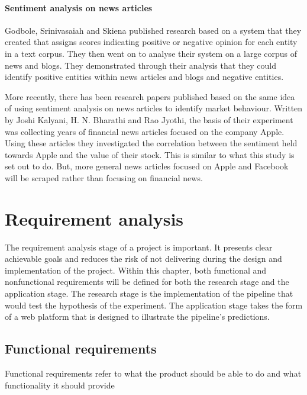 \documentclass[a4paper,11pt]{report}
\begin{document}
\subsubsection{Sentiment analysis on news articles}

Godbole, Srinivasaiah and Skiena published research based on a system that they created that assigns scores indicating positive or negative opinion for each entity in a text corpus. They then went on to analyse their system on a large corpus of news and blogs. They demonstrated through their analysis that they could identify positive entities within news articles and blogs and negative entities.

More recently, there has been research papers published based on the same idea of using sentiment analysis on news articles to identify market behaviour. Written by Joshi Kalyani, H. N. Bharathi and Rao Jyothi, the basis of their experiment was collecting years of financial news articles focused on the company Apple. Using these articles they investigated the correlation between the sentiment held towards Apple and the value of their stock. This is similar to what this study is set out to do. But, more general news articles focused on Apple and Facebook will be scraped rather than focusing on financial news.

\chapter{Requirement analysis}
\label{chap:requirement-anal}

The requirement analysis stage of a project is important. It presents clear achievable goals and reduces the risk of not delivering during the design and implementation of the project. Within this chapter, both functional and nonfunctional requirements will be defined for both the research stage and the application stage. The research stage is the implementation of the pipeline that would test the hypothesis of the experiment. The application stage takes the form of a web platform that is designed to illustrate the pipeline's predictions.

\section{Functional requirements}

Functional requirements refer to what the product should be able to do and what functionality it should provide
\end{document}
